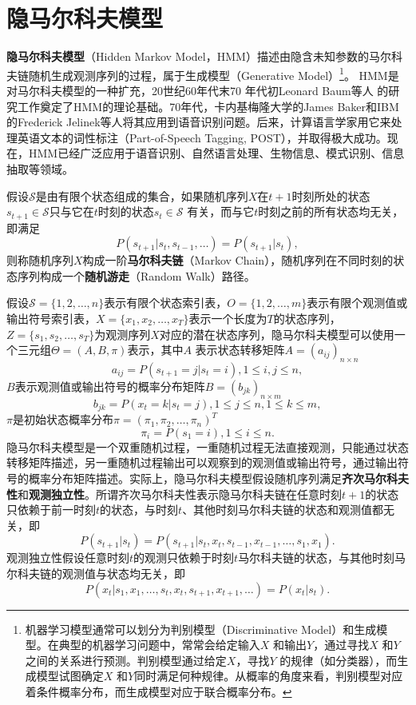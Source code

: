 \section{隐马尔科夫模型}\label{sec:hmm}
\textbf{隐马尔科夫模型}（Hidden Markov Model，HMM）描述由隐含未知参数的马尔科夫链随机生成观测序列的过程，属于生成模型（Generative Model）\footnote{机器学习模型通常可以划分为判别模型（Discriminative Model）和生成模型。在典型的机器学习问题中，常常会给定输入$X$ 和输出$Y$，通过寻找$X$ 和$Y$之间的关系进行预测。判别模型通过给定$X$，寻找$Y$ 的规律（如分类器），而生成模型试图确定$X$ 和$Y$同时满足何种规律。从概率的角度来看，判别模型对应着条件概率分布，而生成模型对应于联合概率分布。}。
HMM是对马尔科夫模型的一种扩充，20世纪60年代末70 年代初Leonard Baum等人\cite{baum1966statistical,baum1967inequality,baum1968growth,baum1970maximization} 的研究工作奠定了HMM的理论基础。70年代，卡内基梅隆大学的James Baker\cite{baker1975dragon}和IBM的Frederick Jelinek等人\cite{jelinek1975design}将其应用到语音识别问题。后来，计算语言学家用它来处理英语文本的词性标注（Part-of-Speech Tagging, POST），并取得极大成功。现在，HMM已经广泛应用于语音识别、自然语言处理、生物信息、模式识别、信息抽取等领域\cite{li2012statlearning}。

\begin{definition}[马尔科夫链]
假设$\mathcal S$是由有限个状态组成的集合，如果随机序列$X$在$t+1$时刻所处的状态$s_{t+1}\in \mathcal S$只与它在$t$时刻的状态$s_t\in \mathcal S$ 有关，而与它$t$时刻之前的所有状态均无关，即满足
\[
    P(s_{t+1}|s_t, s_{t-1},\ldots) = P(s_{t+1}|s_t),
\]
则称随机序列$X$构成一阶\textbf{马尔科夫链}（Markov Chain），随机序列在不同时刻的状态序列构成一个\textbf{随机游走}（Random Walk）路径。
\end{definition}

假设$\mathcal S=\{1,2,\ldots,n\}$表示有限个状态索引表，$O=\{1,2,\ldots,m\}$表示有限个观测值或输出符号索引表，$X=\{x_1,x_2,\ldots,x_T\}$表示一个长度为$T$的状态序列，$Z=\{s_1,s_2,\ldots,s_T\}$为观测序列$X$对应的潜在状态序列，隐马尔科夫模型可以使用一个三元组$\Theta=(A, B, \pi)$表示，其中$A$ 表示状态转移矩阵$A= (a_{ij})_{n\times n}$
\[
    a_{ij} = P(s_{t+1} = j|s_t = i),1\le i,j\le n,
\]
$B$表示观测值或输出符号的概率分布矩阵$B=(b_{jk})_{n\times m}$
\[
    b_{jk} = P(x_t = k|s_t = j),1\le j\le n,1\le k\le m,
\]
$\pi$是初始状态概率分布$\pi = (\pi_1,\pi_2,\ldots,\pi_n)^T$
\[
    \pi_i = P(s_1=i),1\le i\le n.
\]
隐马尔科夫模型是一个双重随机过程，一重随机过程无法直接观测，只能通过状态转移矩阵描述，另一重随机过程输出可以观察到的观测值或输出符号，通过输出符号的概率分布矩阵描述。实际上，隐马尔科夫模型假设随机序列满足\textbf{齐次马尔科夫性}和\textbf{观测独立性}。所谓齐次马尔科夫性表示隐马尔科夫链在任意时刻$t+1$的状态只依赖于前一时刻$t$的状态，与时刻$t$、其他时刻马尔科夫链的状态和观测值都无关，即
\[
    P(s_{t+1}|s_t) = P(s_{t+1}|s_t,x_t,s_{t-1},x_{t-1},\ldots,s_1,x_1).
\]
观测独立性假设任意时刻$t$的观测只依赖于时刻$t$马尔科夫链的状态，与其他时刻马尔科夫链的观测值与状态均无关，即
\[
    P(x_t|s_1,x_1, \ldots,s_t,x_t,s_{t+1},x_{t+1},\ldots) = P(x_t|s_t).
\]

